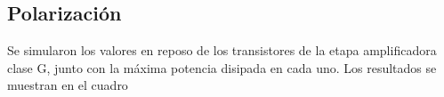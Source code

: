
\subsection{Polarización}

\par Se simularon los valores en reposo de los transistores de la etapa amplificadora clase G, junto con la máxima potencia disipada en cada uno. Los resultados se muestran en el cuadro ~\\

\begin{table}[H]  %
    
    \setlength\arrayrulewidth{1.5pt}
    \def\clinecolor{\hhline{|>{\arrayrulecolor{white}}-%
    >{\arrayrulecolor{white}}|-|-|-|-|-|}}
    

\end{table}
